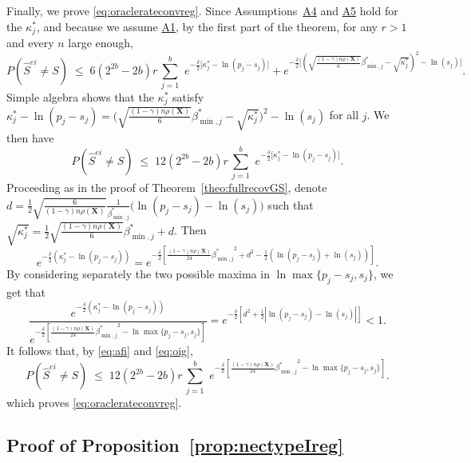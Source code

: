 \documentclass[
  12pt]{article}
\newcommand{\bX}{\mathbf{X}}
\begin{document}
Finally, we prove \eqref{eq:oraclerateconvreg}. Since Assumptions~\hyperlink{lab:A4}{A4} and \hyperlink{lab:A5}{A5} hold for the $\kappa^*_j$, and because we assume \hyperlink{lab:A1}{A1}, by the first part of the theorem, for any $r> 1$ and every $n$ large enough,
\begin{equation*}
 P(\hat{S}^{ei} \neq S)\;\leq\; 6(2^{2b}-2b)r\,\sum_{j=1}^b\,\, e^{-\tfrac{\delta}{2}\big[\kappa_j^*-\ln(p_j-s_j)\big]} + 
    e^{-\tfrac{\delta}{2}\big[(\sqrt{\frac{(1-\gamma) n\rho(\bX)}{6}}{\beta_{\min,j}^*} - \sqrt{\kappa_j^*})^2 -\ln(s_j) \big]}.
\end{equation*}
Simple algebra shows that the $\kappa_j^*$ satisfy $\kappa^*_j-\ln(p_j-s_j)=\big(\sqrt{\frac{(1-\gamma) n\rho(\bX)}{6}}{\beta_{\min,j}^*} - \sqrt{\kappa_j^*}\big)^2 -\ln(s_j)$ for all $j$. We then have
\begin{equation}\label{eq:afi}
 P(\hat{S}^{ei} \neq S)\;\leq\; 12(2^{2b}-2b)r\,\sum_{j=1}^b\,\, e^{-\tfrac{\delta}{2}\big[\kappa_j^*-\ln(p_j-s_j)\big]}.
\end{equation}
 Proceeding as in the proof of Theorem~\ref{theo:fullrecovGS}, denote \\$d =\frac12\sqrt{\frac{6}{(1-\gamma) n\rho(\bX)}}\frac{1}{\beta_{\min,j}^*}\big(\ln({p_j-s_j})-\ln({s_j})\big)$ such that $\sqrt{\kappa^*_j}=  \frac12\sqrt{\frac{(1-\gamma) n\rho(\bX)}{6}}{\beta_{\min,j}^*} + d$. Then
$$e^{-\frac{\delta}{2}\left(\kappa^*_j-\ln(p_j-s_j)\right)}
=e^{-\frac{\delta}{2}\left[\frac{(1-\gamma) n\rho(\bX)}{24}{\beta_{\min,j}^*}^2+d^2 - \frac{1}{2}\left(\ln (p_j- s_j)+\ln (s_j)\right)\right]}.$$
By considering separately the two possible maxima in $\ln \max\{p_j-s_j,s_j\}$, we get that
\begin{equation}\label{eq:oig}
    \frac{e^{-\frac{\delta}{2}\left(\kappa^*_j-\ln(p_j-s_j)\right)}}{e^{-\frac{\delta}{2}\left[\frac{(1-\gamma) n\rho(\bX)}{24}{\beta_{\min,j}^*}^2-\ln \max\{p_j-s_j,s_j\}\right]}}= 
e^{-\frac{\delta}{2}\left[d^2 + \frac{1}{2}\left|\ln (p_j- s_j)-\ln (s_j)\right|\right]} <1.
\end{equation}
It follows that, by \eqref{eq:afi} and \eqref{eq:oig},
$$P(\hat{S}^{ei} \neq S) \; \leq \; 12(2^{2b}-2b)r\,\sum_{j=1}^b\,\, e^{-\frac{\delta}{2}\left[\frac{(1-\gamma) n\rho(\bX)}{24}{\beta_{\min,j}^*}^2-\ln \max\{p_j-s_j,s_j\}\right]}.$$
which proves \eqref{eq:oraclerateconvreg}.

\subsection{Proof of Proposition~\ref{prop:nectypeIreg}}
\end{document}

